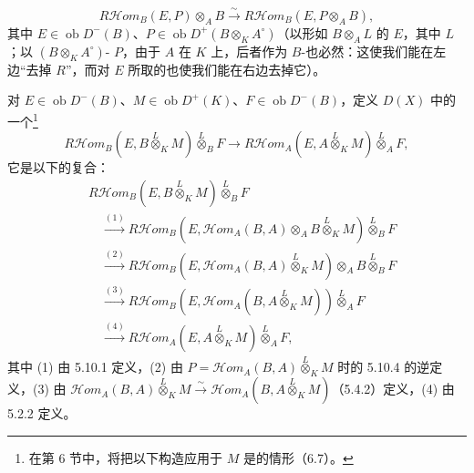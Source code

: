 \begin{equation}R\mathcal{H}\!om_B(E,P)\otimes_A B\xrightarrow\sim R\mathcal{H}\!om_B(E,P\otimes_A B),\tag{5.10.4}\end{equation}
其中 $E\in\operatorname{ob}D^-(B)$、$P\in\operatorname{ob}D^+(B\otimes_K A^\circ)$（以形如 $B\otimes_A L$ 的 $E$，其中 $L$ ；以 $(B\otimes_K A^\circ)$- $P$，由于 $A$ 在 $K$ 上，后者作为 $B$-也必然：这使我们能在左边“去掉 $R$”，而对 $E$ 所取的也使我们能在右边去掉它）。

对 $E\in\operatorname{ob}D^-(B)$、$M\in\operatorname{ob}D^+(K)$、$F\in\operatorname{ob}D^-(B)$，定义 $D(X)$ 中的一个\footnote{在第 6 节中，将把以下构造应用于 $M$ 是的情形（6.7）。}
\begin{equation}R\mathcal{H}\!om_B(E,B\overset L\otimes_K M)\overset L\otimes_B F\longrightarrow R\mathcal{H}\!om_A(E,A\overset L\otimes_K M)\overset L\otimes_A F,\tag{5.10.5}\end{equation}
它是以下的复合：
\[\begin{aligned}
{}&R\mathcal{H}\!om_B(E,B\overset L\otimes_K M)\overset L\otimes_B F\\
&\quad\xrightarrow{(1)}R\mathcal{H}\!om_B(E,\mathcal{H}\!om_A(B,A)\otimes_A B\overset L\otimes_K M)\overset L\otimes_B F\\
&\quad\xrightarrow{(2)}R\mathcal{H}\!om_B(E,\mathcal{H}\!om_A(B,A)\overset L\otimes_K M)\otimes_A B\overset L\otimes_B F\\
&\quad\xrightarrow{(3)}R\mathcal{H}\!om_B(E,\mathcal{H}\!om_A(B,A\overset L\otimes_K M))\overset L\otimes_A F\\
&\quad\xrightarrow{(4)}R\mathcal{H}\!om_A(E,A\overset L\otimes_K M)\overset L\otimes_A F,
\end{aligned}\]
其中 (1) 由 5.10.1 定义，(2) 由 $P=\mathcal{H}\!om_A(B,A)\overset L\otimes_K M$ 时的 5.10.4 的逆定义，(3) 由 $\mathcal{H}\!om_A(B,A)\overset L\otimes_K M\xrightarrow\sim\mathcal{H}\!om_A(B,A\overset L\otimes_K M)$（5.4.2）定义，(4) 由 5.2.2 定义。

